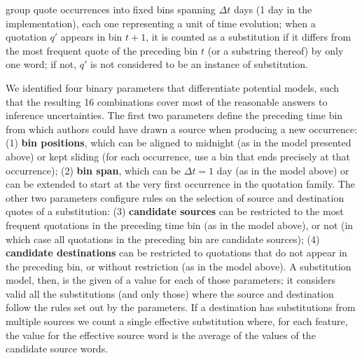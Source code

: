 group quote occurrences into fixed bins spanning $\Delta t$ days (1 day in the implementation), each one representing a unit of time evolution;
when a quotation $q'$ appears in bin $t+1$, it is counted as a substitution if it differs from the most frequent quote of the preceding bin $t$ (or a substring thereof) by only one word;
if not, $q'$ is not considered to be an instance of substitution.

\begin{new}

We identified four binary parameters that differentiate potential models, such that the resulting 16 combinations cover most of the reasonable answers to inference uncertainties.
The first two parameters define the preceding time bin from which authors could have drawn a source when producing a new occurrence:
(1) \textbf{bin positions}, which can be aligned to midnight (as in the model presented above) or kept sliding (for each occurrence, use a bin that ends precisely at that occurrence);
(2) \textbf{bin span}, which can be $\Delta t=1$ day %
(as in the model above) or can be extended to start at the very first occurrence in the quotation family.
The other two parameters configure rules on the selection of source and destination quotes of a substitution:
(3) \textbf{candidate sources} can be restricted to the most frequent quotations in the preceding time bin (as in the model above), or not (in which case all quotations in the preceding bin are candidate sources);
(4) \textbf{candidate destinations} can be restricted to quotations that do not appear in the preceding bin, or without restriction (as in the model above).
A substitution model, then, is the given of a value for each of those parameters;
it considers valid all the substitutions (and only those) where the source and destination follow the rules set out by the parameters.
If a destination has substitutions from multiple sources we count a single effective substitution where, for each feature, the value for the effective source word is the average of the values of the candidate source words.

\end{new}
